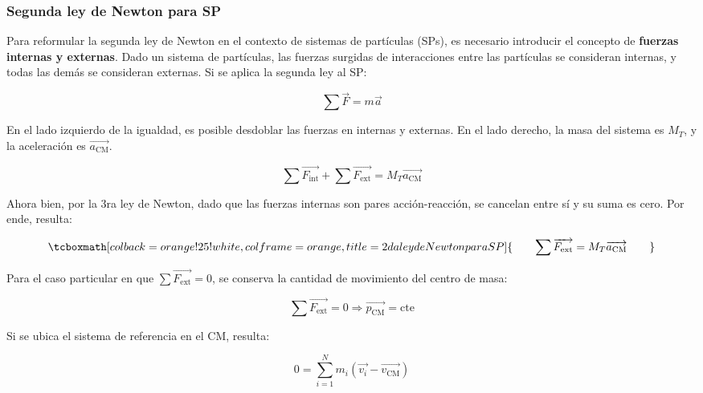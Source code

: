 \documentclass{article}
\begin{document}
\subsubsection{Segunda ley de Newton para SP}

Para reformular la segunda ley de Newton en el contexto de sistemas de partículas (SPs), es necesario introducir el concepto de \textbf{fuerzas internas y externas}. Dado un sistema de partículas, las fuerzas surgidas de interacciones entre las partículas se consideran internas, y todas las demás se consideran externas. Si se aplica la segunda ley al SP:

\begin{equation}
\sum \overrightarrow{F} = m \overrightarrow{a}
\end{equation}

En el lado izquierdo de la igualdad, es posible desdoblar las fuerzas en internas y externas. En el lado derecho, la masa del sistema es $M_T$, y la aceleración es $\overrightarrow{a_{\text{CM}}}$. 

\begin{equation}
\sum \overrightarrow{F_{\text{int}}} + \sum \overrightarrow{F_{\text{ext}}} = M_T \overrightarrow{a_{\text{CM}}}
\end{equation}

Ahora bien, por la 3ra ley de Newton, dado que las fuerzas internas son pares acción-reacción, se cancelan entre sí y su suma es cero. Por ende, resulta:

\begin{equation}
\tcboxmath[colback=orange!25!white,colframe=orange,title=2da ley de Newton para SP]{
\quad \quad \sum \overrightarrow{F_{\text{ext}}} = M_T \overrightarrow{a_{\text{CM}}} \quad \quad
}
\end{equation}

Para el caso particular en que $\sum \overrightarrow{F_{\text{ext}}} = 0$, se conserva la cantidad de movimiento del centro de masa: 

\begin{equation}
\sum \overrightarrow{F_{\text{ext}}} = 0 \Rightarrow \overrightarrow{p_{\text{CM}}} = \text{cte}
\end{equation}

Si se ubica el sistema de referencia en el CM, resulta:

\begin{equation}
0 = \sum_{i=1}^N m_i (\overrightarrow{v_i} - \overrightarrow{v_{\text{CM}}})
\end{equation}
\end{document}
